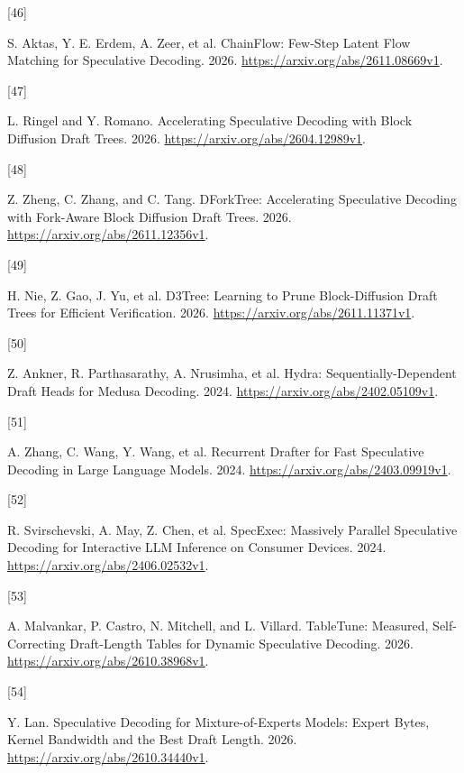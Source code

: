 \documentclass[
  a4paper,
  UTF8,
  fontset=none,
  zihao=5]{ctexart}
\newlength{\cslhangindent}
\newlength{\csllabelwidth}
\newenvironment{CSLReferences}[2] %
 {\begin{list}{}{%
  \setlength{\itemindent}{0pt}
  \setlength{\leftmargin}{0pt}
  \setlength{\parsep}{0pt}
  \ifodd #1
   \setlength{\leftmargin}{\cslhangindent}
   \setlength{\itemindent}{-1\cslhangindent}
  \fi
  \setlength{\itemsep}{#2\baselineskip}}}
 {\end{list}}
\newcommand{\CSLLeftMargin}[1]{\parbox[t]{\csllabelwidth}{\strut#1\strut}}
\newcommand{\CSLRightInline}[1]{\parbox[t]{\linewidth - \csllabelwidth}{\strut#1\strut}}
\begin{document}
\begin{CSLReferences}{0}{0}
\CSLLeftMargin{{[}46{]} }%
\CSLRightInline{S. Aktas, Y. E. Erdem, A. Zeer, et al. {ChainFlow:
Few-Step Latent Flow Matching for Speculative Decoding}. 2026.
\url{https://arxiv.org/abs/2611.08669v1}.}

\CSLLeftMargin{{[}47{]} }%
\CSLRightInline{L. Ringel and Y. Romano. {Accelerating Speculative
Decoding with Block Diffusion Draft Trees}. 2026.
\url{https://arxiv.org/abs/2604.12989v1}.}

\CSLLeftMargin{{[}48{]} }%
\CSLRightInline{Z. Zheng, C. Zhang, and C. Tang. {DForkTree:
Accelerating Speculative Decoding with Fork-Aware Block Diffusion Draft
Trees}. 2026. \url{https://arxiv.org/abs/2611.12356v1}.}

\CSLLeftMargin{{[}49{]} }%
\CSLRightInline{H. Nie, Z. Gao, J. Yu, et al. {D3Tree: Learning to Prune
Block-Diffusion Draft Trees for Efficient Verification}. 2026.
\url{https://arxiv.org/abs/2611.11371v1}.}

\CSLLeftMargin{{[}50{]} }%
\CSLRightInline{Z. Ankner, R. Parthasarathy, A. Nrusimha, et al. {Hydra:
Sequentially-Dependent Draft Heads for Medusa Decoding}. 2024.
\url{https://arxiv.org/abs/2402.05109v1}.}

\CSLLeftMargin{{[}51{]} }%
\CSLRightInline{A. Zhang, C. Wang, Y. Wang, et al. {Recurrent Drafter
for Fast Speculative Decoding in Large Language Models}. 2024.
\url{https://arxiv.org/abs/2403.09919v1}.}

\CSLLeftMargin{{[}52{]} }%
\CSLRightInline{R. Svirschevski, A. May, Z. Chen, et al. {SpecExec:
Massively Parallel Speculative Decoding for Interactive LLM Inference on
Consumer Devices}. 2024. \url{https://arxiv.org/abs/2406.02532v1}.}

\CSLLeftMargin{{[}53{]} }%
\CSLRightInline{A. Malvankar, P. Castro, N. Mitchell, and L. Villard.
{TableTune: Measured, Self-Correcting Draft-Length Tables for Dynamic
Speculative Decoding}. 2026. \url{https://arxiv.org/abs/2610.38968v1}.}

\CSLLeftMargin{{[}54{]} }%
\CSLRightInline{Y. Lan. {Speculative Decoding for Mixture-of-Experts
Models: Expert Bytes, Kernel Bandwidth and the Best Draft Length}. 2026.
\url{https://arxiv.org/abs/2610.34440v1}.}


\end{CSLReferences}
\end{document}
